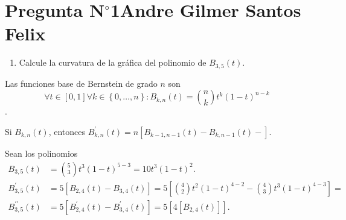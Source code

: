 \section{Pregunta N$^{\circ}$1\qquad Andre Gilmer Santos Felix}

\begin{frame}
    \begin{enumerate}\setcounter{enumi}{0}
        \item

              Calcule la curvatura de la gráfica del polinomio de
              $B_{3,5}\left(t\right)$.
    \end{enumerate}

    \begin{solution}

        \begin{definition}
            Las funciones base de Bernstein de grado $n$ son
            \begin{equation*}
                \forall t\in\left[0,1\right]
                \forall k\in\left\{0,\dotsc,n\right\}:
                B_{k,n}\left(t\right)=
                \binom{n}{k}
                t^{k}
                \left(1-t\right)^{n-k}
            \end{equation*}.
        \end{definition}

        \begin{theorem}
            Si $B_{k,n}\left(t\right)$, entonces
            \begin{math}
                B^{\prime}_{k,n}\left(t\right)=
                n
                \left[
                    B_{k-1,n-1}\left(t\right)-
                    B_{k,n-1}\left(t\right)-
                    \right]
            \end{math}.
        \end{theorem}

        Sean los polinomios
        \begin{align*}
            B_{3,5}\left(t\right)                & =
            \binom{5}{3}
            t^{3}
            \left(1-t\right)^{5-3}=
            10t^{3}{\left(1-t\right)}^{2}.           \\
            B^{\prime}_{3,5}\left(t\right)       & =
            5
            \left[
                B_{2,4}\left(t\right)-
                B_{3,4}\left(t\right)
                \right]=
            5
            \left[
            \binom{4}{2}t^{2}\left(1-t\right)^{4-2}-
            \binom{4}{3}t^{3}\left(1-t\right)^{4-3}
            \right]=                                 \\
            B^{\prime\prime}_{3,5}\left(t\right) & =
            5\left[B^{\prime}_{2,4}\left(t\right)-B^{\prime}_{3,4}\left(t\right)\right]=
            5\left[
                4\left[B_{2,4}\left(t\right)\right]
                \right].
        \end{align*}


\end{solution}
\end{frame}

